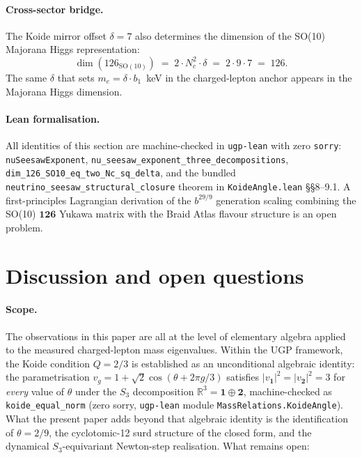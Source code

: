 \documentclass[11pt]{article}
\theoremstyle{remark}
\begin{document}
\paragraph{Cross-sector bridge.}
The Koide mirror offset $\delta = 7$ also determines the dimension of the SO(10) Majorana Higgs representation:
\[
\dim(126_{\mathrm{SO}(10)}) \;=\; 2 \cdot N_c^2 \cdot \delta \;=\; 2 \cdot 9 \cdot 7 \;=\; 126.
\]
The same $\delta$ that sets $m_e = \delta \cdot b_1$~keV in the charged-lepton anchor appears in the Majorana Higgs dimension.

\paragraph{Lean formalisation.}
All identities of this section are machine-checked in \texttt{ugp-lean} with zero \texttt{sorry}:
\texttt{nu\allowbreak Seesaw\allowbreak Exponent}, \texttt{nu\_seesaw\allowbreak\_exponent\allowbreak\_three\allowbreak\_decompositions},
\texttt{dim\_126\allowbreak\_SO10\allowbreak\_eq\allowbreak\_two\allowbreak\_Nc\allowbreak\_sq\allowbreak\_delta},
and the bundled \texttt{neutrino\allowbreak\_seesaw\allowbreak\_structural\allowbreak\_closure} theorem
in \texttt{KoideAngle.lean} \S\S8--9.1.
A first-principles Lagrangian derivation of the $b^{29/9}$ generation scaling combining the SO(10) $\mathbf{126}$ Yukawa matrix with the Braid Atlas flavour structure is an open problem.

\section{Discussion and open questions}
\label{sec:discussion}

\paragraph{Scope.}
The observations in this paper are all at the level of elementary algebra applied to the measured charged-lepton mass eigenvalues.  Within the UGP framework, the Koide condition $Q=2/3$ is established as an unconditional algebraic identity: the parametrisation $v_g = 1 + \sqrt{2}\cos(\theta + 2\pi g/3)$ satisfies $|v_{\mathbf{1}}|^2 = |v_{\mathbf{2}}|^2 = 3$ for \emph{every} value of $\theta$ under the $S_3$ decomposition $\mathbb{R}^3 = \mathbf{1}\oplus\mathbf{2}$, machine-checked as \texttt{koide\_equal\_norm} (zero sorry, \texttt{ugp-lean} module \texttt{MassRelations.KoideAngle}).  What the present paper adds beyond that algebraic identity is the identification of $\theta = 2/9$, the cyclotomic-12 surd structure of the closed form, and the dynamical $S_3$-equivariant Newton-step realisation.  What remains open:
\end{document}
